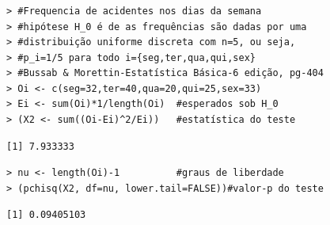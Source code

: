 \documentclass[14pt,aspectratio=1610]{beamer}
\begin{document}
\begin{frame}[fragile]{}
\frametitle{}
\begin{block}{}
\begin{verbatim}
> #Frequencia de acidentes nos dias da semana
> #hipótese H_0 é de as frequências são dadas por uma 
> #distribuição uniforme discreta com n=5, ou seja, 
> #p_i=1/5 para todo i={seg,ter,qua,qui,sex} 
> #Bussab & Morettin-Estatística Básica-6 edição, pg-404
> Oi <- c(seg=32,ter=40,qua=20,qui=25,sex=33)
> Ei <- sum(Oi)*1/length(Oi)  #esperados sob H_0
> (X2 <- sum((Oi-Ei)^2/Ei))   #estatística do teste
\end{verbatim}

\begin{verbatim}
[1] 7.933333
\end{verbatim}
\begin{verbatim}
> nu <- length(Oi)-1          #graus de liberdade
> (pchisq(X2, df=nu, lower.tail=FALSE))#valor-p do teste
\end{verbatim}

\begin{verbatim}
[1] 0.09405103
\end{verbatim}
\nocite{walmes}
\end{block}
\end{frame}
\end{document}
